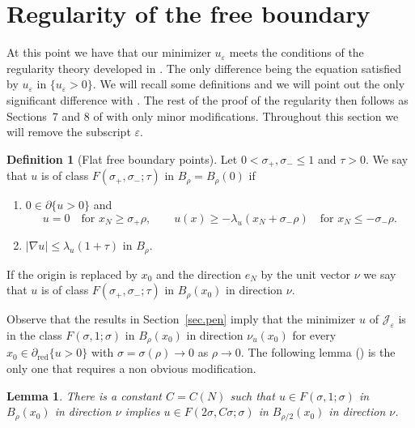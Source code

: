 \documentclass[11pt]{amsart}
\newtheorem{lemma}{Lemma}[section]
\theoremstyle{definition}
\newtheorem{definition}{Definition}[section]
\theoremstyle{remark}
\numberwithin{equation}{section}
\newcommand{\cJ}{\mathcal{J}}
\newcommand{\red}{\mathrm{red}}
\begin{document}
\section{Regularity of the free boundary}\label{sec.fb}

At this point we have that our minimizer $u_\varepsilon$ meets the conditions of the regularity theory developed in \cite{AC}. The only difference being the equation satisfied by $u_\varepsilon$ in $\{u_\varepsilon>0\}$. We will recall some definitions and we will point out the only significant difference with \cite{AC}. The rest of the proof of the regularity then follows as Sections~7 and 8 of \cite{AC} with only minor modifications. Throughout this section we will remove the subscript $\varepsilon$.

\begin{definition}[Flat free boundary points]
Let $0<\sigma_+,\sigma_-\le1$ and $\tau>0$. We say that $u$ is of class $F(\sigma_+,\sigma_-;\tau)$ in $B_\rho=B_\rho(0)$ if
\begin{enumerate}
\item $0\in\partial\{u>0\}$ and
\[
u=0\quad\text{for } x_N\ge\sigma_+\rho,\qquad u(x)\ge-\lambda_u(x_N+\sigma_-\rho)\quad\text{for } x_N\le-\sigma_-\rho.
\]
\item $|\nabla u|\le\lambda_u(1+\tau)$ in $B_\rho$.
\end{enumerate}
If the origin is replaced by $x_0$ and the direction $e_N$ by the unit vector $\nu$ we say that $u$ is of class $F(\sigma_+,\sigma_-;\tau)$ in $B_\rho(x_0)$ in direction $\nu$.
\end{definition}

Observe that the results in Section~\ref{sec.pen} imply that the minimizer $u$ of $\cJ_\varepsilon$ is in the class $F(\sigma,1;\sigma)$ in $B_\rho(x_0)$ in direction $\nu_u(x_0)$ for every $x_0\in\partial_\red\{u>0\}$ with $\sigma=\sigma(\rho)\to0$ as $\rho\to0$. The following lemma (\cite[Lemma~7.2]{AC}) is the only one that requires a non obvious modification.

\begin{lemma}\label{l.flat}
There is a constant $C=C(N)$ such that $u\in F(\sigma,1;\sigma)$ in $B_\rho(x_0)$ in direction $\nu$ implies $u\in F(2\sigma,C\sigma;\sigma)$ in $B_{\rho/2}(x_0)$ in direction $\nu$.
\end{lemma}
\end{document}
